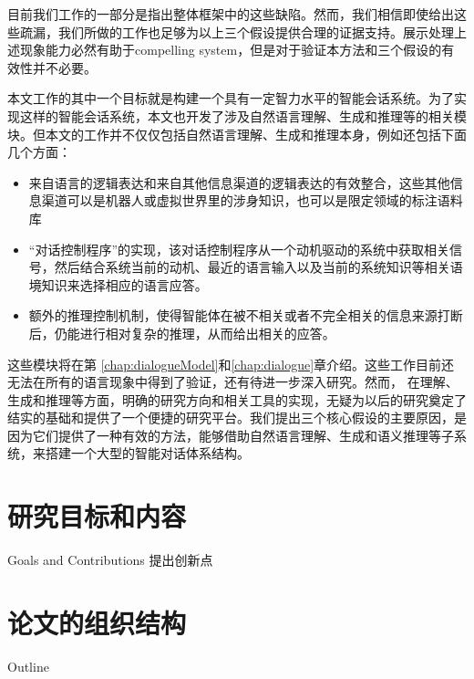 目前我们工作的一部分是指出整体框架中的这些缺陷。然而，我们相信即使给出这些疏漏，我们所做的工作也足够为以上三个假设提供合理的证据支持。展示处理上述现象能力必然有助于compelling system，但是对于验证本方法和三个假设的有效性并不必要。

本文工作的其中一个目标就是构建一个具有一定智力水平的智能会话系统。为了实现这样的智能会话系统，本文也开发了涉及自然语言理解、生成和推理等的相关模块。但本文的工作并不仅仅包括自然语言理解、生成和推理本身，例如还包括下面几个方面：
\begin{itemize}
\item 来自语言的逻辑表达和来自其他信息渠道的逻辑表达的有效整合，这些其他信息渠道可以是机器人或虚拟世界里的涉身知识，也可以是限定领域的标注语料库
\item “对话控制程序”的实现，该对话控制程序从一个动机驱动的系统中获取相关信号，然后结合系统当前的动机、最近的语言输入以及当前的系统知识等相关语境知识来选择相应的语言应答。
\item 额外的推理控制机制，使得智能体在被不相关或者不完全相关的信息来源打断后，仍能进行相对复杂的推理，从而给出相关的应答。
\end{itemize}

这些模块将在第 \ref{chap:dialogueModel}和\ref{chap:dialogue}章介绍。这些工作目前还无法在所有的语言现象中得到了验证，还有待进一步深入研究。然而， 在理解、生成和推理等方面，明确的研究方向和相关工具的实现，无疑为以后的研究奠定了结实的基础和提供了一个便捷的研究平台。我们提出三个核心假设的主要原因，是因为它们提供了一种有效的方法，能够借助自然语言理解、生成和语义推理等子系统，来搭建一个大型的智能对话体系结构。

\section{研究目标和内容}{Goals and Contributions}
提出创新点

\section{论文的组织结构}{Outline}


